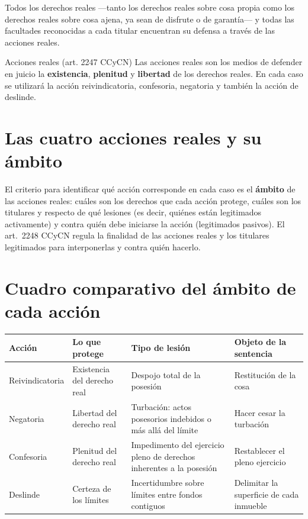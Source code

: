 \documentclass[12pt,oneside]{book}
\begin{document}
Todos los derechos reales ---tanto los derechos reales sobre cosa propia como los derechos reales sobre cosa ajena, ya sean de disfrute o de garantía--- y todas las facultades reconocidas a cada titular encuentran su defensa a través de las acciones reales.

\begin{definition}{Acciones reales (art. 2247 CCyCN)}
Las acciones reales son los medios de defender en juicio la \textbf{existencia}, \textbf{plenitud} y \textbf{libertad} de los derechos reales. En cada caso se utilizará la acción reivindicatoria, confesoria, negatoria y también la acción de deslinde.
\end{definition}

\section{Las cuatro acciones reales y su ámbito}

El criterio para identificar qué acción corresponde en cada caso es el \textbf{ámbito} de las acciones reales: cuáles son los derechos que cada acción protege, cuáles son los titulares y respecto de qué lesiones (es decir, quiénes están legitimados activamente) y contra quién debe iniciarse la acción (legitimados pasivos). El art.\ 2248 CCyCN regula la finalidad de las acciones reales y los titulares legitimados para interponerlas y contra quién hacerlo.

\section{Cuadro comparativo del ámbito de cada acción}

\begin{table}[H]
\centering
\small
\begin{tabularx}{\textwidth}{
    >{\raggedright\arraybackslash}p{}
    >{\raggedright\arraybackslash}X
    >{\raggedright\arraybackslash}X
    >{\raggedright\arraybackslash}X
}
\toprule
\textbf{Acción} & \textbf{Lo que protege} & \textbf{Tipo de lesión} & \textbf{Objeto de la sentencia} \\
\midrule
Reivindicatoria & Existencia del derecho real & Despojo total de la posesión & Restitución de la cosa \\
Negatoria & Libertad del derecho real & Turbación: actos posesorios indebidos o más allá del límite & Hacer cesar la turbación \\
Confesoria & Plenitud del derecho real & Impedimento del ejercicio pleno de derechos inherentes a la posesión & Restablecer el pleno ejercicio \\
Deslinde & Certeza de los límites & Incertidumbre sobre límites entre fondos contiguos & Delimitar la superficie de cada inmueble \\
\bottomrule
\end{tabularx}
\end{table}
\end{document}
